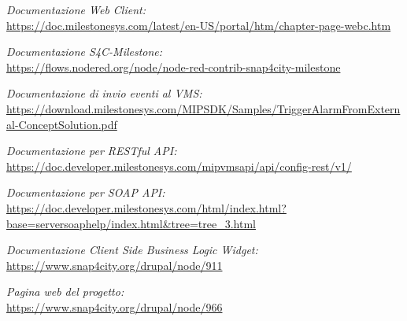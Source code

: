\documentclass[a4paper, openright, thesis]{report}
\begin{document}
\begin{thebibliography}{9}
\emph{Documentazione Web Client: \\}
\url{https://doc.milestonesys.com/latest/en-US/portal/htm/chapter-page-webc.htm}

\emph{Documentazione S4C-Milestone: \\}
\url{https://flows.nodered.org/node/node-red-contrib-snap4city-milestone}

\emph{Documentazione di invio eventi al VMS: \\}
\url{https://download.milestonesys.com/MIPSDK/Samples/TriggerAlarmFromExternal-ConceptSolution.pdf}

\emph{Documentazione per RESTful API: \\}
\url{https://doc.developer.milestonesys.com/mipvmsapi/api/config-rest/v1/}

\emph{Documentazione per SOAP API: \\}
\url{https://doc.developer.milestonesys.com/html/index.html?base=serversoaphelp/index.html&tree=tree_3.html}

\emph{Documentazione Client Side Business Logic Widget: \\}
\url{https://www.snap4city.org/drupal/node/911}

\emph{Pagina web del progetto: \\}
\url{https://www.snap4city.org/drupal/node/966}

\end{thebibliography}
\end{document}
